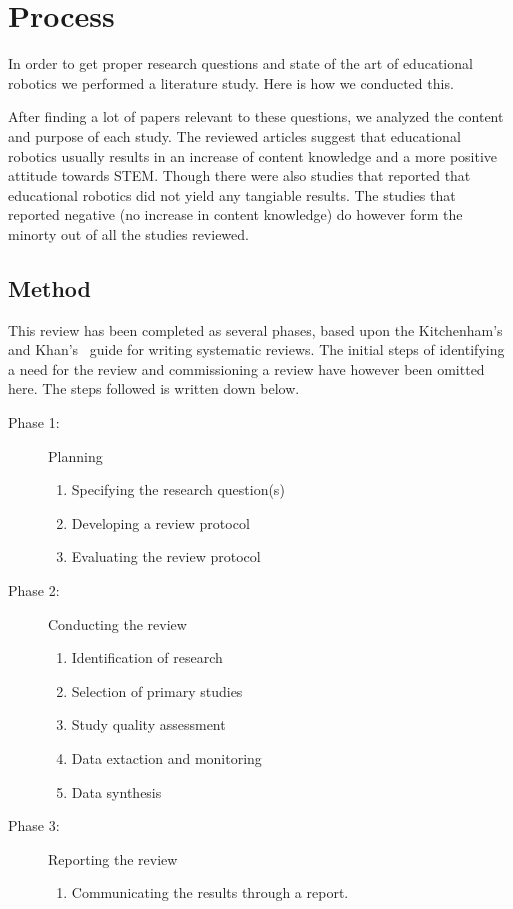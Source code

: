 \chapter{Process}
In order to get proper research questions and state of the art of educational robotics we performed a literature study. Here is how we conducted this. 

After finding a lot of papers relevant to these questions, we analyzed the content and purpose of each study.
	The reviewed articles suggest that educational robotics usually results in an increase of content knowledge and a more positive attitude towards STEM. 
	Though there were also studies that reported that educational robotics did not yield any tangiable results. 
	The studies that reported negative (no increase in content knowledge) do however form the minorty out of all the studies reviewed. 
	
\section{Method}
This review has been completed as several phases, based upon the Kitchenham's \cite{kitchenham2007guidelines} and Khan's~\cite{khan2001undertaking} guide for writing systematic reviews. The initial steps of identifying a need for the review and commissioning a review have however been omitted here. The steps followed is written down below.
\begin{description}
	\item[Phase 1: ] Planning
		\begin{enumerate}
			\item Specifying the research question(s)
			\item Developing a review protocol
			\item Evaluating the review protocol
		\end{enumerate}
	\item[Phase 2: ] Conducting the review
		\begin{enumerate}
			\item Identification of research
			\item Selection of primary studies
			\item Study quality assessment
			\item Data extaction and monitoring
			\item Data synthesis
		\end{enumerate}
	\item[Phase 3: ] Reporting the review
		\begin{enumerate}
			\item Communicating the results through a report.
		\end{enumerate}
\end{description}

